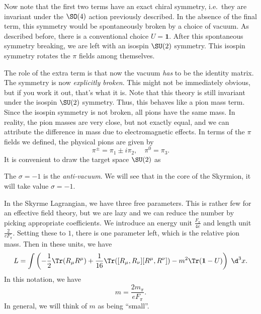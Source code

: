 \documentclass[a4paper]{article}
\begin{document}
Now note that the first two terms have an exact chiral symmetry, i.e.\ they are invariant under the $\SO(4)$ action previously described. In the absence of the final term, this symmetry would be spontaneously broken by a choice of vacuum. As described before, there is a conventional choice $U = \mathbf{1}$. After this spontaneous symmetry breaking, we are left with an isospin $\SU(2)$ symmetry. This isospin symmetry rotates the $\pi$ fields among themselves.

The role of the extra term is that now the vacuum \emph{has} to be the identity matrix. The symmetry is now \emph{explicitly broken}. This might not be immediately obvious, but if you work it out, that's what it is. Note that this theory is still invariant under the isospin $\SU(2)$ symmetry. Thus, this behaves like a pion mass term. Since the isospin symmetry is not broken, all pions have the same mass. In reality, the pion masses are very close, but not exactly equal, and we can attribute the difference in mass due to electromagnetic effects. In terms of the $\pi$ fields we defined, the physical pions are given by
\[
  \pi^{\pm} = \pi_1 \pm i \pi_2,\quad \pi^0 = \pi_3.
\]
It is convenient to draw the target space $\SU(2)$ as
\begin{center}
\end{center}
The $\sigma = -1$ is the \emph{anti-vacuum}. We will see that in the core of the Skyrmion, it will take value $\sigma = -1$.

In the Skyrme Lagrangian, we have three free parameters. This is rather few for an effective field theory, but we are lazy and we can reduce the number by picking appropriate coefficients. We introduce an energy unit $\frac{F_\pi}{4e}$ and length unit $\frac{2}{eF_\pi}$. Setting these to $1$, there is one parameter left, which is the relative pion mass. Then in these units, we have
\[
  L = \int \left(-\frac{1}{2}\Tr(R_\mu R^\mu) + \frac{1}{16} \Tr([R_\mu, R_\nu][R^\mu, R^\nu]) - m^2 \Tr(\mathbf{1} - U)\right)\;\d^3 x.
\]
In this notation, we have
\[
  m = \frac{2m_\pi}{e F_\pi}.
\]
In general, we will think of $m$ as being ``small''.
\end{document}
